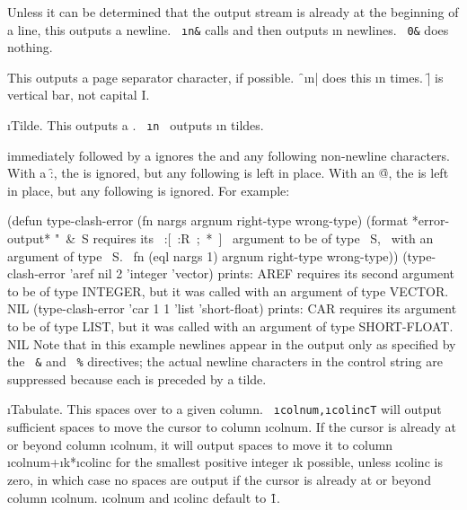 \itemitem{\f{~\&}}

Unless it can be determined that the output stream
is already at the beginning of a line,
this outputs a newline.
{\tt ~\i{n}\&} calls 
and then outputs \i{n} newlines.
{\tt ~0\&} does nothing.

\itemitem{\f{~|}}

This outputs a page separator character, if possible.
\f{~\i{n}|} does this
\i{n} times.  \f{|} is vertical bar, not capital I.

\itemitem{\tt ~~}

\i{Tilde}.
This outputs a .  {\tt ~\i{n}~} outputs \i{n} tildes.

\itemitem{\tt ~\NewlineChar}

 immediately followed by a  ignores the 
and any following non-newline  characters.
With a \f{:},
 the  is ignored, 
 but any following  is left in place.
With an \f{@},
 the  is left in place,
 but any following  is ignored.
For example:

\code
 (defun type-clash-error (fn nargs argnum right-type wrong-type)
   (format *error-output*
           "~&~S requires its ~:[~:R~;~*~]~ 
           argument to be of type ~S,~%
           with an argument of type ~S.~%
           fn (eql nargs 1) argnum right-type wrong-type))
 (type-clash-error 'aref nil 2 'integer 'vector)  prints:
AREF requires its second argument to be of type INTEGER,
but it was called with an argument of type VECTOR.
NIL
 (type-clash-error 'car 1 1 'list 'short-float)  prints:
CAR requires its argument to be of type LIST,
but it was called with an argument of type SHORT-FLOAT.
NIL
\endcode
Note that in this example newlines appear in the output only as specified
by the {\tt ~\&} and {\tt ~\%} directives; the 
actual newline characters
in the control string are suppressed because each is preceded by a tilde.
                                                                     

\i{Tabulate}.
This spaces over to a given column.
{\tt ~\i{colnum},\i{colinc}T} will output
sufficient spaces to move the cursor to column \i{colnum}.  If the cursor
is already at or beyond column \i{colnum}, it will output spaces to move it to
column \i{colnum}+\i{k}*\i{colinc} for the smallest positive integer
\i{k} possible, unless \i{colinc} is zero, in which case no spaces
are output if the cursor is already at or beyond column \i{colnum}.
\i{colnum} and \i{colinc} default to \f{1}.

